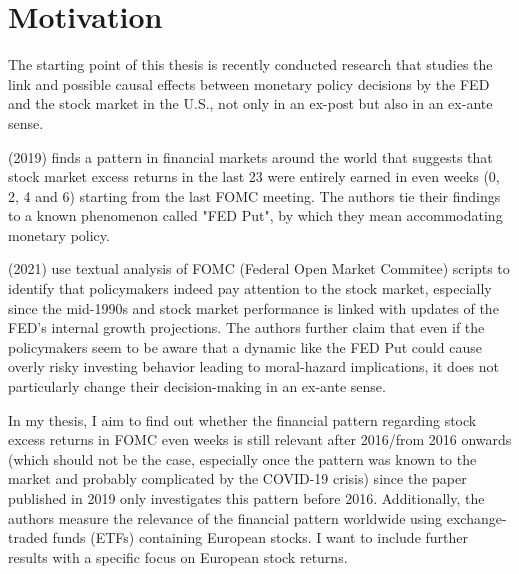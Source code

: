 
\chapter{Motivation}

The starting point of this thesis is recently conducted research that studies the link and possible causal effects between monetary policy decisions by the FED and the stock market in the U.S., not only in an ex-post but also in an ex-ante sense.

\cite{cieslak_stock_2019} (2019) finds a pattern in financial markets around the world that suggests that stock market excess returns in the last 23 were entirely earned in even weeks (0, 2, 4 and 6) starting from the last FOMC meeting. The authors tie their findings to a known phenomenon called "FED Put", by which they mean accommodating monetary policy.

\cite{cieslak_economics_2021} (2021) use textual analysis of FOMC (Federal Open Market Commitee) scripts to identify that policymakers indeed pay attention to the stock market, especially since the mid-1990s and stock market performance is linked with updates of the FED’s internal growth projections.  The authors further claim that even if the policymakers seem to be aware that a dynamic like the FED Put could cause overly risky investing behavior leading to moral-hazard implications,  it does not particularly change their decision-making in an ex-ante sense.

In my thesis,  I aim to find out whether the financial pattern regarding stock excess returns in FOMC even weeks is still relevant after 2016/from 2016 onwards (which should not be the case, especially once the pattern was known to the market and probably complicated by the COVID-19 crisis) since the paper published in 2019 only investigates this pattern before 2016. Additionally, the authors measure the relevance of the financial pattern worldwide using exchange-traded funds (ETFs) containing European stocks. I want to include further results with a specific focus on European stock returns.




